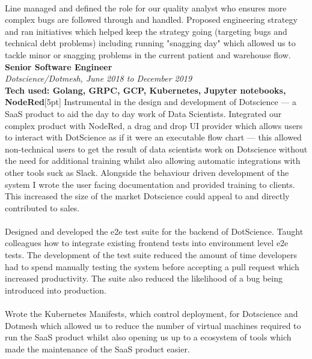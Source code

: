 \documentclass{article}
\begin{document}
\begin{flushleft}
\paragraph{}Line managed and defined the role for our quality analyst who ensures more complex bugs are followed through and handled. Proposed engineering strategy and ran initiatives which helped keep the strategy going (targeting bugs and technical debt problems) including running "snagging day" which allowed us to tackle minor or snagging problems in the current patient and warehouse flow.\\[10pt]

\textbf{Senior Software Engineer}\\
\textit{Dotscience/Dotmesh, June 2018 to December 2019}\\
\textbf{Tech used: Golang, GRPC, GCP, Kubernetes, Jupyter notebooks, NodeRed}[5pt]
Instrumental in the design and development of Dotscience — a SaaS product to aid the day to day work of Data Scientists. Integrated our complex product with NodeRed, a drag and drop UI provider which allows users to interact with DotScience as if it were an executable flow chart — this allowed non-technical users to get the result of data scientists work on Dotscience without the need for additional training whilst also allowing automatic integrations with other tools suck as Slack. Alongside the behaviour driven development of the system I wrote the user facing documentation and provided training to clients. This increased the size of the market Dotscience could appeal to and directly contributed to sales.

\paragraph{}Designed and developed the e2e test suite for the backend of DotScience. Taught colleagues how to integrate existing frontend tests into environment level e2e tests. The development of the test suite reduced the amount of time developers had to spend manually testing the system before accepting a pull request which increased productivity. The suite also reduced the likelihood of a bug being introduced into production. 

\paragraph{}Wrote the Kubernetes Manifests, which control deployment, for Dotscience and Dotmesh which allowed us to reduce the number of virtual machines required to run the SaaS product whilst also opening us up to a ecosystem of tools which made the maintenance of the SaaS product easier.


\end{flushleft}
\end{document}
